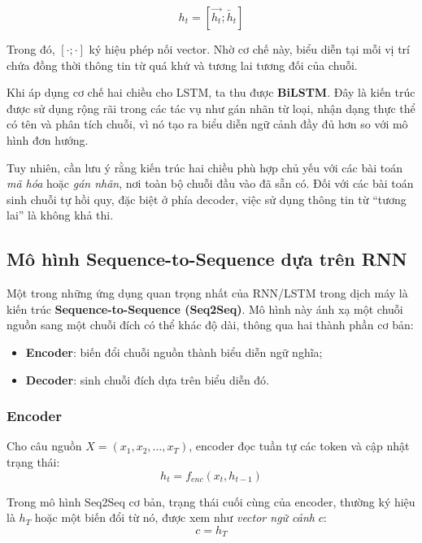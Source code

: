\documentclass[a4paper,12pt,twoside]{report}
\begin{document}
\begin{equation}
h_t = [\overrightarrow{h_t}; \overleftarrow{h_t}]
\end{equation}

Trong đó, $[\cdot;\cdot]$ ký hiệu phép nối vector. Nhờ cơ chế này, biểu diễn tại mỗi vị trí chứa đồng thời thông tin từ quá khứ và tương lai tương đối của chuỗi.

Khi áp dụng cơ chế hai chiều cho LSTM, ta thu được \textbf{BiLSTM}. Đây là kiến trúc được sử dụng rộng rãi trong các tác vụ như gán nhãn từ loại, nhận dạng thực thể có tên và phân tích chuỗi, vì nó tạo ra biểu diễn ngữ cảnh đầy đủ hơn so với mô hình đơn hướng.

Tuy nhiên, cần lưu ý rằng kiến trúc hai chiều phù hợp chủ yếu với các bài toán \textit{mã hóa} hoặc \textit{gán nhãn}, nơi toàn bộ chuỗi đầu vào đã sẵn có. Đối với các bài toán sinh chuỗi tự hồi quy, đặc biệt ở phía decoder, việc sử dụng thông tin từ ``tương lai'' là không khả thi.

\subsection{Mô hình Sequence-to-Sequence dựa trên RNN}

Một trong những ứng dụng quan trọng nhất của RNN/LSTM trong dịch máy là kiến trúc \textbf{Sequence-to-Sequence (Seq2Seq)}. Mô hình này ánh xạ một chuỗi nguồn sang một chuỗi đích có thể khác độ dài, thông qua hai thành phần cơ bản:
\begin{itemize}
    \item \textbf{Encoder}: biến đổi chuỗi nguồn thành biểu diễn ngữ nghĩa;
    \item \textbf{Decoder}: sinh chuỗi đích dựa trên biểu diễn đó.
\end{itemize}

\subsubsection{Encoder}

Cho câu nguồn $X = (x_1, x_2, \dots, x_T)$, encoder đọc tuần tự các token và cập nhật trạng thái:
\begin{equation}
h_t = f_{enc}(x_t, h_{t-1})
\end{equation}

Trong mô hình Seq2Seq cơ bản, trạng thái cuối cùng của encoder, thường ký hiệu là $h_T$ hoặc một biến đổi từ nó, được xem như \textit{vector ngữ cảnh} $c$:
\begin{equation}
c = h_T
\end{equation}
\end{document}

